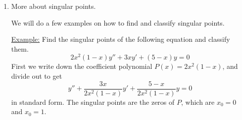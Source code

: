 \documentclass[11pt, letterpaper, oneside]{article}     %
\numberwithin{equation}{subsection}
\theoremstyle{definition}
\numberwithin{theorem}{section}
\theoremstyle{remark}
\begin{document}
\begin{enumerate}
  \underline{Example:} Solve the Euler equation
  \begin{equation}
    x^2\frac{d^2y}{dx^2} - 2x\frac{dy}{dx} - 4y = 0
  \end{equation}
  The idea behind Euler equations is the following observation. Notice that if we set $x = e^t$, then
  \begin{equation}
    x\frac{dy}{dx} = \frac{dx}{dt}\frac{dy}{dx} = \frac{dy}{dt}.
  \end{equation}
  This is a great simplification of the linear term in our differential equation! But what about the second order term? With a little more calculus, we find
  \begin{equation}
    x^2\frac{d^2y}{dx^2} = \frac{d^2y}{dt^2} - \frac{dy}{dt}
  \end{equation}
  This is fanastic, because it turns Euler's equation into a constant coefficient equation, which we know how to solve:
  \begin{equation}
    \left(\frac{d^2y}{dt^2} - \frac{dy}{dt}\right) - 2\frac{dy}{dt} - 4y = 0.
  \end{equation}
  This is the motivation for setting $x = e^t$.

  The rest of the solution is familiar; we find the characteristic polynomial $\tilde p(z) = z^2 - 3z - 4 = (z-4)(z+1)$, with roots $z = 4$ and $z = -1$. So we can write the general solution
  \begin{equation}
    y = C_1e^{4t}+C_2e^{-t}.
  \end{equation}
  But the original equation was not written in terms of $t$. Substituting back in $x = e^t$, we obtain the final solution in terms of $x$:
  \begin{equation}
    y(x) = C_1x^4+C_2x^{-1}.
  \end{equation}

\item More about singular points.

  We will do a few examples on how to find and classify singular points.

  \underline{Example:} Find the singular points of the following equation and classify them.
  \begin{equation}
    2x^2(1-x)y'' + 3xy' + (5-x)y = 0
  \end{equation}
  First we write down the coefficient polynomial $P(x) = 2x^2(1-x)$, and divide out to get
  \begin{equation}
    y'' + \frac{3x}{2x^2(1-x)}y' + \frac{5-x}{2x^2(1-x)}y = 0
  \end{equation}
  in standard form. The singular points are the zeros of $P$, which are $x_0 = 0$ and $x_0 = 1$.


\end{enumerate}
\end{document}
